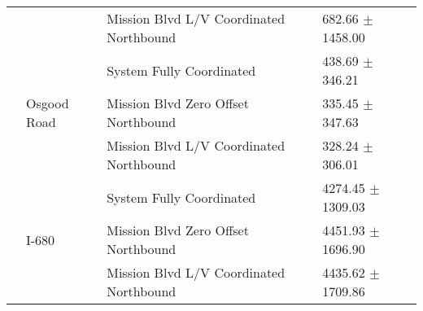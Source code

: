 \begin{tabular}{llll}
 &  & Mission Blvd L/V Coordinated Northbound & 682.66 $\pm$ 1458.00 \\
 & \multirow[t]{3}{*}{Osgood Road} & System Fully Coordinated & 438.69 $\pm$ 346.21 \\
 &  & Mission Blvd Zero Offset Northbound & 335.45 $\pm$ 347.63 \\
 &  & Mission Blvd L/V Coordinated Northbound & 328.24 $\pm$ 306.01 \\
 & \multirow[t]{3}{*}{I-680} & System Fully Coordinated & 4274.45 $\pm$ 1309.03 \\
 &  & Mission Blvd Zero Offset Northbound & 4451.93 $\pm$ 1696.90 \\
 &  & Mission Blvd L/V Coordinated Northbound & 4435.62 $\pm$ 1709.86 \\
\bottomrule
\end{tabular}
